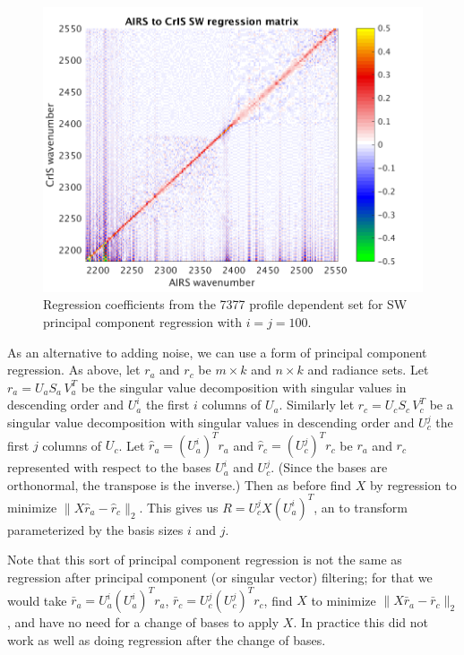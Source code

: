 \documentclass[10pt,twocolumn]{article}
\begin{document}
\begin{figure} %
  \centering
  \includegraphics[width=\linewidth]{figures/SW_pc_regr_mat.png}
  \caption{Regression coefficients from the 7377 profile dependent
    set for SW principal component regression with $i = j = 100$.}
  \label{dreg9}
\end{figure}

As an alternative to adding noise, we can use a form of principal
component regression.  As above, let $r_a$ and $r_c$ be $m \times k$
and $n \times k$ {\airs} and {\cris} radiance sets.  Let $r_a = U_a
S_a\,V_a^T$ be the singular value decomposition with singular values
in descending order and $U_a^i$ the first $i$ columns of $U_a$.
Similarly let $r_c = U_c S_c\,V_c^T$ be a singular value
decomposition with singular values in descending order and $U_c^j$
the first $j$ columns of $U_c$.  Let $\hat r_a = (U_a^i)^T r_a$ and
$\hat r_c = (U_c^j)^T r_c$ be $r_a$ and $r_c$ represented with
respect to the bases $U_a^i$ and $U_c^j$.  (Since the bases are
orthonormal, the transpose is the inverse.)  Then as before find $X$
by regression to minimize $\|X \hat r_a - \hat r_c\|_2$.  This gives
us $R = U_c^j X (U_a^i)^T$, an {\airs} to {\cris} transform
parameterized by the basis sizes $i$ and $j$.


Note that this sort of principal component regression is not the
same as regression after principal component (or singular vector)
filtering; for that we would take $\bar r_a = U_a^i (U_a^i)^T r_a$,
$\bar r_c = U_c^j (U_c^j)^T r_c$, find $X$ to minimize $\|X \bar r_a
- \bar r_c\|_2$, and have no need for a change of bases to apply
$X$.  In practice this did not work as well as doing regression
after the change of bases.
\end{document}

